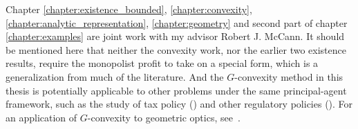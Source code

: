 \begin{remark}
	Chapter \ref{chapter:existence_bounded}, \ref{chapter:convexity}, \ref{chapter:analytic_representation}, \ref{chapter:geometry} and second part of chapter \ref{chapter:examples} are joint work with my advisor Robert J. McCann. It should be mentioned here that neither the convexity work, nor the earlier two existence results, require the monopolist profit to take on a special form, which is a generalization from much of the literature. And the $G$-convexity method in this thesis is potentially applicable to other problems under the same principal-agent framework, such as the study of tax policy (\cite{Mirrlees71}) and other regulatory policies (\cite{BaronMyerson82}). For an application of $G$-convexity to geometric optics, see~\cite{GuillenKitagawaCPAM}. \medskip
	
\end{remark}






